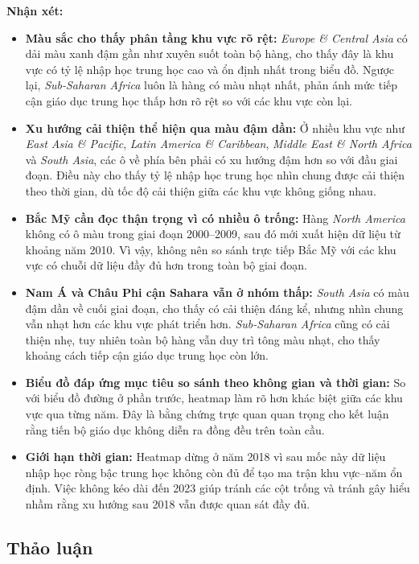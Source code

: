 \textbf{Nhận xét:}
\begin{itemize}
    \item \textbf{Màu sắc cho thấy phân tầng khu vực rõ rệt:} \textit{Europe \& Central Asia} có dải màu xanh đậm gần như xuyên suốt toàn bộ hàng, cho thấy đây là khu vực có tỷ lệ nhập học trung học cao và ổn định nhất trong biểu đồ. Ngược lại, \textit{Sub-Saharan Africa} luôn là hàng có màu nhạt nhất, phản ánh mức tiếp cận giáo dục trung học thấp hơn rõ rệt so với các khu vực còn lại.
    \item \textbf{Xu hướng cải thiện thể hiện qua màu đậm dần:} Ở nhiều khu vực như \textit{East Asia \& Pacific}, \textit{Latin America \& Caribbean}, \textit{Middle East \& North Africa} và \textit{South Asia}, các ô về phía bên phải có xu hướng đậm hơn so với đầu giai đoạn. Điều này cho thấy tỷ lệ nhập học trung học nhìn chung được cải thiện theo thời gian, dù tốc độ cải thiện giữa các khu vực không giống nhau.
    \item \textbf{Bắc Mỹ cần đọc thận trọng vì có nhiều ô trống:} Hàng \textit{North America} không có ô màu trong giai đoạn 2000--2009, sau đó mới xuất hiện dữ liệu từ khoảng năm 2010. Vì vậy, không nên so sánh trực tiếp Bắc Mỹ với các khu vực có chuỗi dữ liệu đầy đủ hơn trong toàn bộ giai đoạn.
    \item \textbf{Nam Á và Châu Phi cận Sahara vẫn ở nhóm thấp:} \textit{South Asia} có màu đậm dần về cuối giai đoạn, cho thấy có cải thiện đáng kể, nhưng nhìn chung vẫn nhạt hơn các khu vực phát triển hơn. \textit{Sub-Saharan Africa} cũng có cải thiện nhẹ, tuy nhiên toàn bộ hàng vẫn duy trì tông màu nhạt, cho thấy khoảng cách tiếp cận giáo dục trung học còn lớn.
    \item \textbf{Biểu đồ đáp ứng mục tiêu so sánh theo không gian và thời gian:} So với biểu đồ đường ở phần trước, heatmap làm rõ hơn khác biệt giữa các khu vực qua từng năm. Đây là bằng chứng trực quan quan trọng cho kết luận rằng tiến bộ giáo dục không diễn ra đồng đều trên toàn cầu.
    \item \textbf{Giới hạn thời gian:} Heatmap dừng ở năm 2018 vì sau mốc này dữ liệu nhập học ròng bậc trung học không còn đủ để tạo ma trận khu vực--năm ổn định. Việc không kéo dài đến 2023 giúp tránh các cột trống và tránh gây hiểu nhầm rằng xu hướng sau 2018 vẫn được quan sát đầy đủ.
\end{itemize}

\subsection{Thảo luận}

